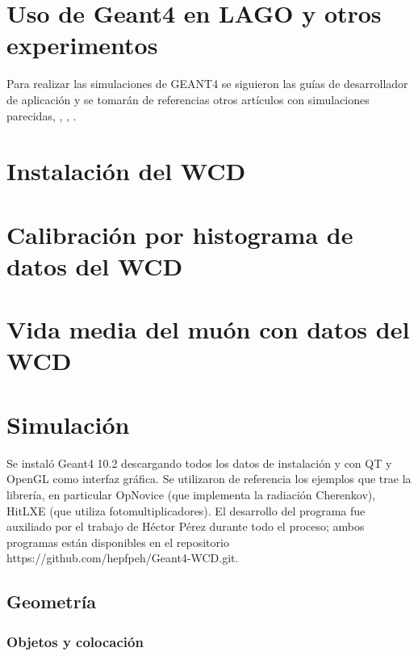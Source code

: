 \documentclass{book}
\begin{document}
\section{Uso de Geant4 en LAGO y otros experimentos}

Para realizar las simulaciones de GEANT4 se siguieron las gu\'ias de desarrollador de aplicaci\'on y se tomar\'an de referencias otros art\'iculos con simulaciones parecidas, \citep{NIELSEN}, \citep{CHEN}, \citep{CALDERON}.



\section{Instalaci\'on del WCD}

\section{Calibraci\'on por histograma de datos del WCD}

\section{Vida media del mu\'on con datos del WCD}

\section{Simulaci\'on}
Se instal\'o Geant4 10.2 descargando todos los datos de instalaci\'on y con QT y OpenGL como interfaz gr\'afica. Se utilizaron de referencia los ejemplos que trae la librer\'ia, en particular OpNovice (que implementa la radiaci\'on Cherenkov), HitLXE (que utiliza fotomultiplicadores). El desarrollo del programa fue auxiliado por el trabajo de H\'ector P\'erez durante todo el proceso; ambos programas est\'an disponibles en el repositorio https://github.com/hepfpeh/Geant4-WCD.git.
\subsection{Geometr\'ia}
\subsubsection{Objetos y colocaci\'on}
\end{document}
